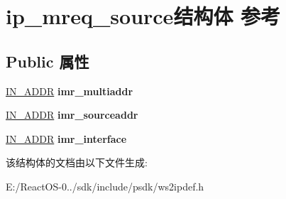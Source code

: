 \hypertarget{structip__mreq__source}{}\section{ip\+\_\+mreq\+\_\+source结构体 参考}
\label{structip__mreq__source}
\subsection*{Public 属性}
\begin{DoxyCompactItemize}
\item 
\mbox{\label{structip__mreq__source_a20d3a35bd794738312e315bc87c72d4d}} 
\hyperlink{structin__addr}{I\+N\+\_\+\+A\+D\+DR} {\bfseries imr\+\_\+multiaddr}
\item 
\mbox{\label{structip__mreq__source_ade2a1adb59e08718b748cb98e2907ddd}} 
\hyperlink{structin__addr}{I\+N\+\_\+\+A\+D\+DR} {\bfseries imr\+\_\+sourceaddr}
\item 
\mbox{\label{structip__mreq__source_aacd67d635c59dd74c4a221ddac6882b8}} 
\hyperlink{structin__addr}{I\+N\+\_\+\+A\+D\+DR} {\bfseries imr\+\_\+interface}
\end{DoxyCompactItemize}


该结构体的文档由以下文件生成\+:\begin{DoxyCompactItemize}
\item 
E\+:/\+React\+O\+S-\/0../sdk/include/psdk/ws2ipdef.\+h\end{DoxyCompactItemize}
